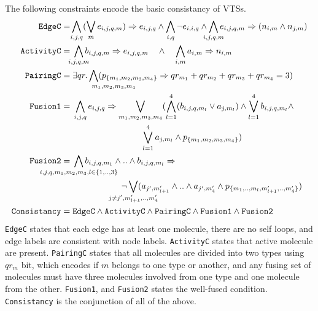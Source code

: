 The following constraints encode the basic consistancy of VTSs.
\begin{align*}
  \texttt{EdgeC} =\;&\hspace{-1ex}\bigwedge\limits_{i,j,q} (\bigvee_m e_{i,j,q,m} )\limplies e_{i,j,q}
  \land
  \bigwedge\limits_{i,q} \neg e_{i,i,q}
  \land
  \bigwedge\limits_{\mathclap{i,j,q,m}} e_{i,j,q,m} \limplies (n_{i,m} \land n_{j,m} )
  \\
  \texttt{ActivityC} =\;&
  \bigwedge\limits_{\mathclap{i,j,q,m}} b_{i,j,q,m} \limplies e_{i,j,q,m} \quad\land\quad
  \bigwedge\limits_{i,m} a_{i,m} \limplies n_{i,m}
  \\
  \texttt{PairingC} =\;&
  \exists qr. \Land\limits_{\mathrlap{m_1,m_2,m_3,m_4}\;\;}
                         (p_{\{m_1,m_2,m_3,m_4\}} \limplies qr_{m_1} + qr_{m_2} + qr_{m_3} + qr_{m_4} = 3) 
  \\
  \texttt{Fusion1} =\;&
  \bigwedge\limits_{i,j,q} e_{i,j,q} \limplies
  \bigvee_{{m_1,m_2,m_3,m_4}} (\Land_{l=1}^4 ( b_{i,j,q,m_l} \lor a_{j,m_l} ) \land 
                        \Lor\limits_{l=1}^4 b_{i,j,q,m_l} \land\\
  & \qquad \qquad \qquad \qquad \Lor\limits_{l=1}^4 a_{j,m_l}\land p_{\{m_1,m_2,m_3,m_4\}})
  \\
  \texttt{Fusion2} =\;&
\bigwedge\limits_{\mathclap{i,j,q,m_1,m_2,m_3, l \in \{1,..,3\}}} b_{i,j,q,m_1} \land ..\land b_{i,j,q,m_l} \limplies \\
  & \hspace{2cm} \neg 
  \bigvee_{\mathclap{j \neq j^{\prime}, m_{l+1}^{\prime},..,m_{4}^{\prime}}} ( a_{j^{\prime},m_{l+1}^{\prime}} \land .. \land a_{j^{\prime},m_4^{\prime}} \land p_{\{m_1,..,m_l,m^{\prime}_{l+1},..,m^{\prime}_4\}})
  \\
  \texttt{Consistancy} =\;& \texttt{EdgeC} \land
  \texttt{ActivityC} \land \texttt{PairingC} \land
  \texttt{Fusion1} \land \texttt{Fusion2} 
\end{align*}
\texttt{EdgeC} states that each edge has at least one molecule,
there are no self loops, and edge labels are consistent with node labels.   
\texttt{ActivityC} states that active molecule are present.
\texttt{PairingC} states that all molecules are divided into two types
using $qr_m$ bit, which encodes if $m$ belongs to one type or another,
and any fusing set of molecules must have three molecules involved
from one type and one molecule from the other.
\texttt{Fusion1}, and \texttt{Fusion2} states the well-fused condition.
\texttt{Consistancy} is the conjunction of all of the above.

